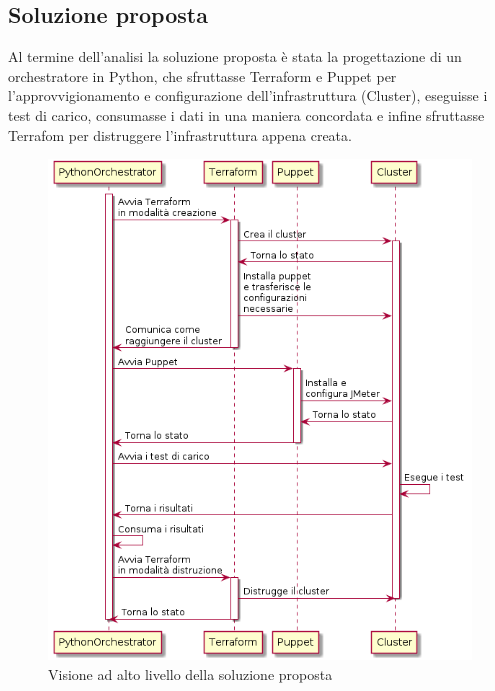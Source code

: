 \subsection{Soluzione proposta}
Al termine dell'analisi la soluzione proposta è stata la progettazione di un orchestratore in Python, che sfruttasse Terraform e Puppet per l'approvvigionamento e configurazione dell'infrastruttura (Cluster), eseguisse i test di carico, consumasse i dati in una maniera concordata e infine sfruttasse Terrafom per distruggere l'infrastruttura appena creata.
\begin{figure}[H]
	\centering
	\includegraphics[width=13cm]{immagini/soluzione}
	\caption{Visione ad alto livello della soluzione proposta}
	\label{img-soluzione}
\end{figure}
